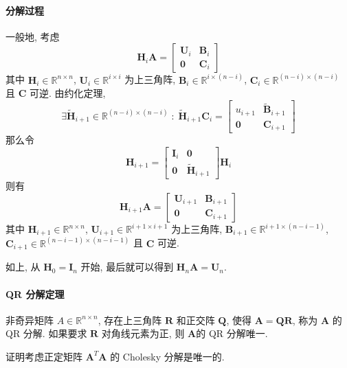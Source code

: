 \documentclass{ctexart}
\newcommand{\Rset}{\mathbb{R}}
\begin{document}
\paragraph{分解过程}
    一般地, 考虑 \[
        \mathbf{H}_i \mathbf{A} = \begin{bmatrix}
            \mathbf{U}_i & \mathbf{B}_i \\
        \mathbf{0} & \mathbf{C}_i\end{bmatrix}\]
    其中 $\mathbf{H}_i \in \Rset^{n \times n}$, $\mathbf{U}_i \in \Rset^{i \times i}$ 为上三角阵,
        $ \mathbf{B}_i \in \Rset^{i \times (n-i)}$, $\mathbf{C}_i \in \Rset^{(n-i) \times (n-i)}$ 且 $\mathbf{C}$ 可逆.
    由约化定理, \[
        \exists \tilde{\mathbf{H}}_{i+1} \in \Rset^{(n-i)\times (n-i)}\;:\;
        \tilde{\mathbf{H}}_{i+1}\mathbf{C}_i = \begin{bmatrix} u_{i+1} & \tilde{\mathbf{B}}_{i+1} \\ \mathbf{0} & \mathbf{C}_{i+1} \end{bmatrix}\]
    那么令 \[
        \mathbf{H}_{i+1} = \begin{bmatrix}  \mathbf{I}_{i} & \mathbf{0} \\ \mathbf{0} & \tilde{\mathbf{H}}_{i+1}  \end{bmatrix} \mathbf{H}_i\]
    则有 \[
        \mathbf{H}_{i+1} \mathbf{A} = \begin{bmatrix}
            \mathbf{U}_{i+1} & \mathbf{B}_{i+1} \\
        \mathbf{0} & \mathbf{C}_{i+1}\end{bmatrix}\]
    其中 $\mathbf{H}_{i+1} \in \Rset^{n \times n}$, $\mathbf{U}_{i+1} \in \Rset^{i+1 \times i+1}$ 为上三角阵,
        $ \mathbf{B}_{i+1} \in \Rset^{i+1 \times (n-i-1)}$, $\mathbf{C}_{i+1} \in \Rset^{(n-i-1) \times (n-i-1)}$ 且 $\mathbf{C}$ 可逆.\par
    如上, 从 $ \mathbf{H}_0 = \mathbf{I}_n$ 开始, 最后就可以得到 $ \mathbf{H}_n \mathbf{A} = \mathbf{U}_n$.
\paragraph{QR 分解定理}
    非奇异矩阵 $A \in \Rset^{n \times n}$,
    存在上三角阵 $\mathbf{R}$ 和正交阵 $\mathbf{Q}$, 使得 $\mathbf{A} = \mathbf{Q} \mathbf{R} $,
    称为 $\mathbf{A} $ 的 QR 分解.
    如果要求 $\mathbf{R}$ 对角线元素为正, 则 $\mathbf{A} $的 QR 分解唯一.\par
    证明考虑正定矩阵 $\mathbf{A}^T \mathbf{A} $ 的 Cholesky 分解是唯一的.
\end{document}

